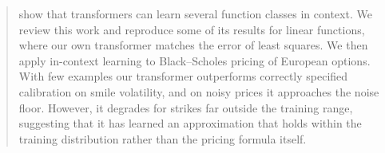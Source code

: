 \begin{abstract}
    \citet{garg2022what} show that transformers can learn several function classes in
    context. We review this work and reproduce some of its results for linear functions,
    where our own transformer matches the error of least squares. We then apply
    in-context learning to Black--Scholes pricing of European options. With few examples our transformer outperforms correctly specified
    calibration on smile volatility, and on noisy prices it approaches the noise floor.
    However, it degrades for strikes far outside the training range, suggesting that it
    has learned an approximation that holds within the training distribution rather than
    the pricing formula itself.
  
  
\end{abstract}

